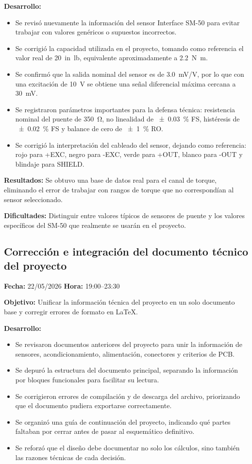\documentclass[12pt]{article}
\begin{document}
\textbf{Desarrollo:}
\begin{itemize}
\item Se revisó nuevamente la información del sensor Interface SM-50 para evitar trabajar con valores genéricos o supuestos incorrectos.
\item Se corrigió la capacidad utilizada en el proyecto, tomando como referencia el valor real de \SI{20}{in.lb}, equivalente aproximadamente a \SI{2.2}{N.m}.
\item Se confirmó que la salida nominal del sensor es de \SI{3.0}{mV/V}, por lo que con una excitación de \SI{10}{V} se obtiene una señal diferencial máxima cercana a \SI{30}{mV}.
\item Se registraron parámetros importantes para la defensa técnica: resistencia nominal del puente de \SI{350}{\ohm}, no linealidad de \SI{\pm 0.03}{\percent} FS, histéresis de \SI{\pm 0.02}{\percent} FS y balance de cero de \SI{\pm 1}{\percent} RO.
\item Se corrigió la interpretación del cableado del sensor, dejando como referencia: rojo para +EXC, negro para -EXC, verde para +OUT, blanco para -OUT y blindaje para SHIELD.
\end{itemize}

\textbf{Resultados:}
Se obtuvo una base de datos real para el canal de torque, eliminando el error de trabajar con rangos de torque que no correspondían al sensor seleccionado.

\textbf{Dificultades:}
Distinguir entre valores típicos de sensores de puente y los valores específicos del SM-50 que realmente se usarán en el proyecto.

\subsection{Corrección e integración del documento técnico del proyecto}
\textbf{Fecha:} 22/05/2026 \quad \textbf{Hora:} 19:00--23:30

\textbf{Objetivo:}
Unificar la información técnica del proyecto en un solo documento base y corregir errores de formato en LaTeX.

\textbf{Desarrollo:}
\begin{itemize}
\item Se revisaron documentos anteriores del proyecto para unir la información de sensores, acondicionamiento, alimentación, conectores y criterios de PCB.
\item Se depuró la estructura del documento principal, separando la información por bloques funcionales para facilitar su lectura.
\item Se corrigieron errores de compilación y de descarga del archivo, priorizando que el documento pudiera exportarse correctamente.
\item Se organizó una guía de continuación del proyecto, indicando qué partes faltaban por cerrar antes de pasar al esquemático definitivo.
\item Se reforzó que el diseño debe documentar no solo los cálculos, sino también las razones técnicas de cada decisión.
\end{itemize}
\end{document}
